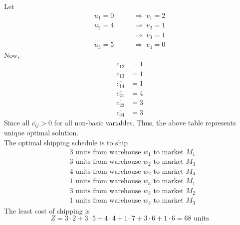 \documentclass[../main-sheet.tex]{subfiles}
\begin{document}
            Let 
        \begin{align*}
            u_1=0\qquad&\Rightarrow\;v_1=2\\
            u_2=4&\Rightarrow\;v_2=1\\
            &\Rightarrow\;v_3=1\\
            u_3=5\qquad&\Rightarrow\;v_4=0
        \end{align*}
        Now,
        \begin{align*}
            \bar{c_{12}}&=1\\
            \bar{c_{13}}&=1\\
            \bar{c_{14}}&=1\\
            \bar{c_{21}}&=4\\
            \bar{c_{22}}&=3\\
            \bar{c_{34}}&=3
        \end{align*}
Since all \(\bar{c_{ij}}>0\) for all non-basic variables. Thus, the above table represents unique optimal solution.\\
The optimal shipping schedule is to ship
\begin{align*}
    &3 \text{ units from warehouse } w_1 \text{ to market } M_1\\
    &3 \text{ units from warehouse } w_2 \text{ to market } M_3\\
    &4 \text{ units from warehouse } w_2 \text{ to market } M_4\\
    &1 \text{ units from warehouse } w_3 \text{ to market } M_1\\
    &3 \text{ units from warehouse } w_3 \text{ to market } M_2\\
    &1 \text{ units from warehouse } w_3 \text{ to market } M_3
\end{align*}
The least cost of shipping is 
\[
    Z=3\cdot2+3\cdot5+4\cdot4+1\cdot7+3\cdot6+1\cdot6=68 \text{ units}
\]
\end{document}
